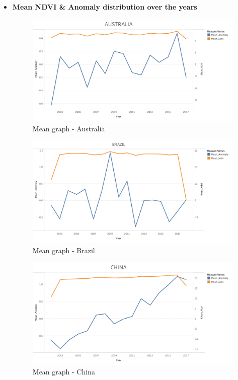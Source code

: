 \begin{itemize}
    \item \textbf{Mean NDVI \& Anomaly distribution over the years}
    
     \begin{figure}[H]
            \centering
            \includegraphics[width=1.0\linewidth]{figures/ch5/Mean/AUSTRALIA_mean.png}
            \caption{Mean graph - Australia}\label{Fig:AUSTRALIA_mean}
    \end{figure}
    
    \begin{figure}[H]
            \centering
            \includegraphics[width=1.0\linewidth]{figures/ch5/Mean/BRAZIL_mean.png}
            \caption{Mean graph - Brazil}\label{Fig:BRAZIL_mean}
    \end{figure}
    
    \begin{figure}[H]
            \centering
            \includegraphics[width=1.0\linewidth]{figures/ch5/Mean/CHINA_mean.png}
            \caption{Mean graph - China}\label{Fig:CHINA_mean}
    \end{figure}
    

\end{itemize}
